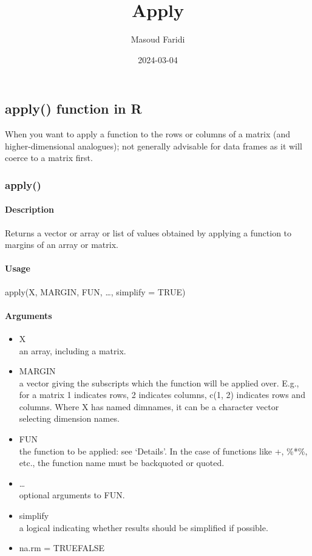 \documentclass[
]{article}
\title{Apply}
\author{Masoud Faridi}
\date{2024-03-04}
\begin{document}
\maketitle

\hypertarget{apply-function-in-r}{%
\subsection{apply() function in R}\label{apply-function-in-r}}

When you want to apply a function to the rows or columns of a matrix
(and higher-dimensional analogues); not generally advisable for data
frames as it will coerce to a matrix first.

\hypertarget{apply}{%
\subsubsection{apply()}\label{apply}}

\hypertarget{description}{%
\paragraph{Description}\label{description}}

Returns a vector or array or list of values obtained by applying a
function to margins of an array or matrix.

\hypertarget{usage}{%
\paragraph{Usage}\label{usage}}

apply(X, MARGIN, FUN, \ldots, simplify = TRUE)

\hypertarget{arguments}{%
\paragraph{Arguments}\label{arguments}}

\begin{itemize}
\item
  X\\
  an array, including a matrix.
\item
  MARGIN\\
  a vector giving the subscripts which the function will be applied
  over. E.g., for a matrix 1 indicates rows, 2 indicates columns, c(1,
  2) indicates rows and columns. Where X has named dimnames, it can be a
  character vector selecting dimension names.
\item
  FUN\\
  the function to be applied: see `Details'. In the case of functions
  like +, \%*\%, etc., the function name must be backquoted or quoted.
\item
  \ldots{}\\
  optional arguments to FUN.
\item
  simplify\\
  a logical indicating whether results should be simplified if possible.
\item
  na.rm = TRUE\textbar FALSE
\end{itemize}
\end{document}
